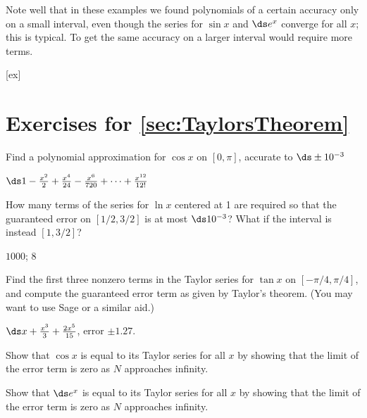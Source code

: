 Note well that in these examples we found polynomials of a certain
accuracy only on a small interval, even though the series for $\sin x$
and $\ds e^x$ converge for all $x$; this is typical. To get the same
accuracy on a larger interval would require more terms. 

[ex]
\section*{Exercises for \ref{sec:TaylorsTheorem}}

\begin{enumialphparenastyle}

\begin{ex}
Find a polynomial approximation for $\cos x$ on $[0,\pi]$,
accurate to $\ds \pm 10^{-3}$
\begin{sol}
$\ds 1-{x^2\over2}+{x^4\over24}-{x^6\over 720}
+\cdots+{x^{12}\over 12!}$
\end{sol}
\end{ex}

\begin{ex}
How many terms of the series for $\ln x$ centered at 1 are
required so that the guaranteed error on $[1/2,3/2]$ is
at most $\ds 10^{-3}$? What if the interval is instead $[1,3/2]$? 
\begin{sol}
$1000$; $8$ 
\end{sol}
\end{ex}

\begin{ex}
Find the first three nonzero terms in the Taylor series for
$\tan x$ on $[-\pi/4,\pi/4]$,
and compute the guaranteed error term as given by 
Taylor's theorem. (You may want to use Sage or a similar aid.)
\begin{sol}
$\ds x+{x^3\over3}+{2x^5\over15}$, error $\pm 1.27$.
\end{sol}
\end{ex}

\begin{ex}
Show that $\cos x$ is equal to its Taylor series for all $x$
by showing that the limit of the error term is zero as $N$ approaches
infinity. 
\end{ex}

\begin{ex}
Show that $\ds e^x$ is equal to its Taylor series for all $x$
by showing that the limit of the error term is zero as $N$ approaches
infinity. 
\end{ex}

\end{enumialphparenastyle}